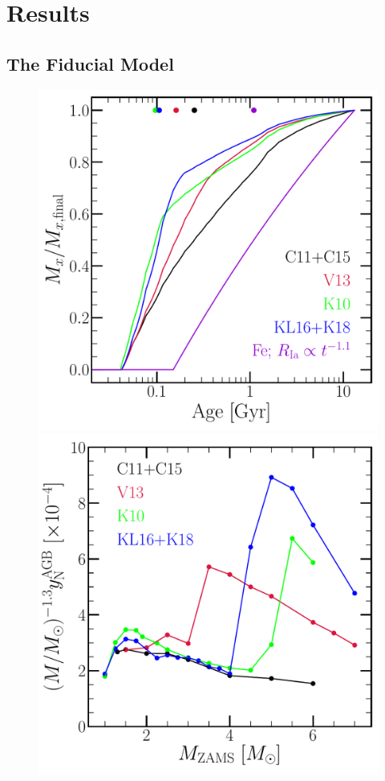 \documentclass[ms.tex]{subfiles}
\begin{document}
 

\section{Results} 
\label{sec:results} 

\subsection{The Fiducial Model} 
\label{sec:results:fiducial} 

\begin{figure} 
\centering 
\includegraphics[scale = 0.45]{ssp_production_modelcomp.pdf} 
\includegraphics[scale = 0.45]{agb_yield_models_imfweighted.pdf} 

\end{figure}
\end{document}
